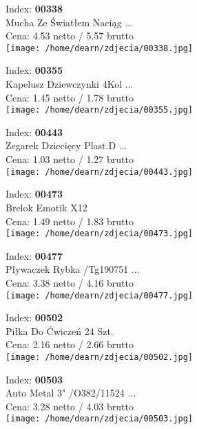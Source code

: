 {Index: \textbf{00338}\\
Mucha Ze Światłem Naciąg  ...\\
Cena: 4.53 netto / 5.57 brutto\\
  \texttt{[image: /home/dearn/zdjecia/00338.jpg]}}\newline\newline

{Index: \textbf{00355}\\
Kapelusz Dziewczynki 4Kol ...\\
Cena: 1.45 netto / 1.78 brutto\\
  \texttt{[image: /home/dearn/zdjecia/00355.jpg]}}\newline\newline

{Index: \textbf{00443}\\
Zegarek Dziecięcy Plast.D ...\\
Cena: 1.03 netto / 1.27 brutto\\
  \texttt{[image: /home/dearn/zdjecia/00443.jpg]}}\newline\newline

{Index: \textbf{00473}\\
Brelok Emotik X12\\
Cena: 1.49 netto / 1.83 brutto\\
  \texttt{[image: /home/dearn/zdjecia/00473.jpg]}}\newline\newline

{Index: \textbf{00477}\\
Pływaczek Rybka /Tg190751 ...\\
Cena: 3.38 netto / 4.16 brutto\\
  \texttt{[image: /home/dearn/zdjecia/00477.jpg]}}\newline\newline

{Index: \textbf{00502}\\
Piłka Do Ćwiczeń 24 Szt.\\
Cena: 2.16 netto / 2.66 brutto\\
  \texttt{[image: /home/dearn/zdjecia/00502.jpg]}}\newline\newline

{Index: \textbf{00503}\\
Auto Metal 3" /O382/11524 ...\\
Cena: 3.28 netto / 4.03 brutto\\
  \texttt{[image: /home/dearn/zdjecia/00503.jpg]}}\newline\newline

